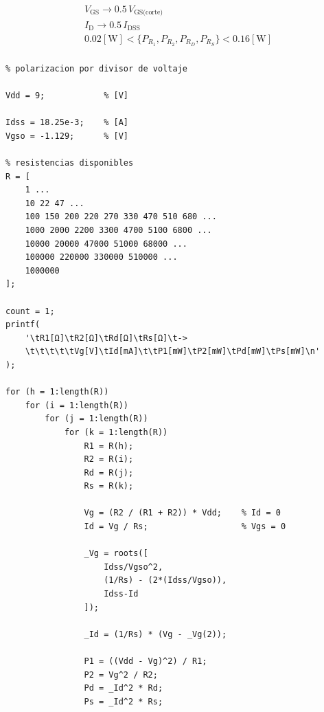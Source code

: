 \documentclass[letter,twoside,11pt]{article}
\begin{document}
\begin{equation*}
    \begin{split}
        V_{\text{GS}} \rightarrow 0.5\,V_{\text{GS(corte)}}\\
        I_{\text{D}} \rightarrow 0.5\,I_{\text{DSS}}\\
        0.02[\text{W}] < \{P_{R_1}, P_{R_2}, P_{R_D}, P_{R_S}\} < 0.16[\text{W}]\\
    \end{split}
\end{equation*}

\footnotesize
\begin{shaded}
\begin{verbatim}
% polarizacion por divisor de voltaje

Vdd = 9;            % [V]

Idss = 18.25e-3;    % [A]
Vgso = -1.129;      % [V]

% resistencias disponibles
R = [
    1 ...
    10 22 47 ...
    100 150 200 220 270 330 470 510 680 ...
    1000 2000 2200 3300 4700 5100 6800 ...
    10000 20000 47000 51000 68000 ...
    100000 220000 330000 510000 ...
    1000000
];

count = 1;
printf(
    '\tR1[Ω]\tR2[Ω]\tRd[Ω]\tRs[Ω]\t->
    \t\t\t\t\tVg[V]\tId[mA]\t\tP1[mW]\tP2[mW]\tPd[mW]\tPs[mW]\n'
);

for (h = 1:length(R))
    for (i = 1:length(R))
        for (j = 1:length(R))
            for (k = 1:length(R))
                R1 = R(h);
                R2 = R(i);
                Rd = R(j);
                Rs = R(k);

                Vg = (R2 / (R1 + R2)) * Vdd;    % Id = 0
                Id = Vg / Rs;                   % Vgs = 0

                _Vg = roots([
                    Idss/Vgso^2,
                    (1/Rs) - (2*(Idss/Vgso)),
                    Idss-Id
                ]);

                _Id = (1/Rs) * (Vg - _Vg(2));

                P1 = ((Vdd - Vg)^2) / R1;
                P2 = Vg^2 / R2;
                Pd = _Id^2 * Rd;
                Ps = _Id^2 * Rs;


\end{verbatim}
\end{shaded}
\end{document}
